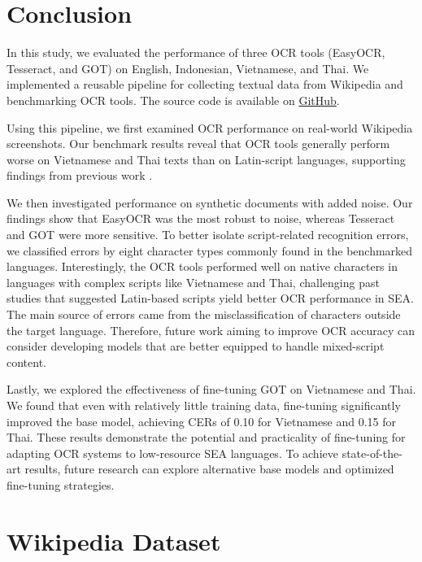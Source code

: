 \documentclass[12pt,oneside]{memoir}
\begin{document}
\chapter{Conclusion}

In this study, we evaluated the performance of three OCR tools (EasyOCR, Tesseract, and GOT) on English, Indonesian, Vietnamese, and Thai.
We implemented a reusable pipeline for collecting textual data from Wikipedia and benchmarking OCR tools.
The source code is available on \href{https://github.com/jasonqiu212/ocr-benchmarking-on-sea-languages}{GitHub}.

Using this pipeline, we first examined OCR performance on real-world Wikipedia screenshots.
Our benchmark results reveal that OCR tools generally perform worse on Vietnamese and Thai texts than on Latin-script languages, supporting findings from previous work \parencite{ignat-etal-2022}.

We then investigated performance on synthetic documents with added noise.
Our findings show that EasyOCR was the most robust to noise, whereas Tesseract and GOT were more sensitive.
To better isolate script-related recognition errors, we classified errors by eight character types commonly found in the benchmarked languages.
Interestingly, the OCR tools performed well on native characters in languages with complex scripts like Vietnamese and Thai, challenging past studies that suggested Latin-based scripts yield better OCR performance in SEA.
The main source of errors came from the misclassification of characters outside the target language. 
Therefore, future work aiming to improve OCR accuracy can consider developing models that are better equipped to handle mixed-script content.

Lastly, we explored the effectiveness of fine-tuning GOT on Vietnamese and Thai.
We found that even with relatively little training data, fine-tuning significantly improved the base model, achieving CERs of 0.10 for Vietnamese and 0.15 for Thai.
These results demonstrate the potential and practicality of fine-tuning for adapting OCR systems to low-resource SEA languages.
To achieve state-of-the-art results, future research can explore alternative base models and optimized fine-tuning strategies.

\printbibliography[title={References}]

\clearpage
\appendix
\renewcommand{\chaptername}{Appendix}

\chapter{Wikipedia Dataset}
\end{document}
